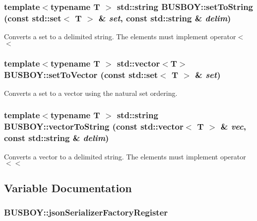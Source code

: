 \label{namespaceBUSBOY_a533d026b15dd61e6cecd58c893351a91}
\hypertarget{namespaceBUSBOY_ab379f561542ab99122e582c5d8d7a4de}{
\subsubsection[{setToString}]{\setlength{\rightskip}{0pt plus 5cm}template$<$typename T $>$ std::string BUSBOY::setToString (const std::set$<$ T $>$ \& {\em set}, \/  const std::string \& {\em delim})}}
\label{namespaceBUSBOY_ab379f561542ab99122e582c5d8d7a4de}


Converts a set to a delimited string. The elements must implement operator$<$$<$ \hypertarget{namespaceBUSBOY_a30565802dd1d32848b0780a68bb1c3f2}{
\subsubsection[{setToVector}]{\setlength{\rightskip}{0pt plus 5cm}template$<$typename T $>$ std::vector$<$T$>$ BUSBOY::setToVector (const std::set$<$ T $>$ \& {\em set})}}
\label{namespaceBUSBOY_a30565802dd1d32848b0780a68bb1c3f2}


Converts a set to a vector using the natural set ordering. \hypertarget{namespaceBUSBOY_a68fd7fa31d51e040063f543e540a3ab4}{
\subsubsection[{vectorToString}]{\setlength{\rightskip}{0pt plus 5cm}template$<$typename T $>$ std::string BUSBOY::vectorToString (const std::vector$<$ T $>$ \& {\em vec}, \/  const std::string \& {\em delim})}}
\label{namespaceBUSBOY_a68fd7fa31d51e040063f543e540a3ab4}


Converts a vector to a delimited string. The elements must implement operator$<$$<$ 

\subsection{Variable Documentation}
\hypertarget{namespaceBUSBOY_a214b8e47f93cf25f6a034c961ad58f2e}{
\subsubsection[{jsonSerializerFactoryRegister}]{ {\bf BUSBOY::jsonSerializerFactoryRegister}}}
\label{namespaceBUSBOY_a214b8e47f93cf25f6a034c961ad58f2e}
